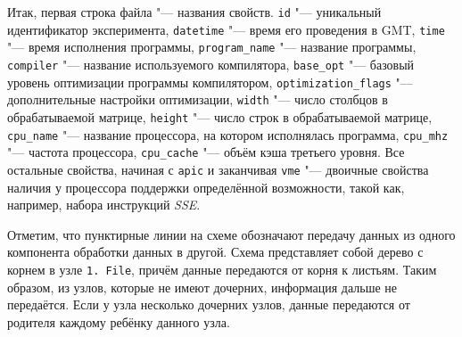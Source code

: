 \clearpage

Итак, первая строка файла "--- названия свойств. \texttt{id} "--- уникальный идентификатор эксперимента, \texttt{datetime} "--- время его проведения в GMT, \texttt{time} "--- время исполнения программы, \texttt{program_name} "--- название программы, \texttt{compiler} "--- название используемого компилятора, \texttt{base_opt} "--- базовый уровень оптимизации программы компилятором, \texttt{optimization_flags} "--- дополнительные настройки оптимизации, \texttt{width} "--- число столбцов в обрабатываемой матрице, \texttt{height} "--- число строк в обрабатываемой матрице, \texttt{cpu_name} "--- название процессора, на котором исполнялась программа, \texttt{cpu_mhz} "--- частота процессора, \texttt{cpu_cache} "--- объём кэша третьего уровня. Все остальные свойства, начиная с \texttt{apic} и заканчивая \texttt{vme} "--- двоичные свойства наличия у процессора поддержки определённой возможности, такой как, например, набора инструкций \textit{SSE}.

Отметим, что пунктирные линии на схеме обозначают передачу данных из одного компонента обработки данных в другой. Схема представляет собой дерево с корнем в узле \texttt{1.\,File}, причём данные передаются от корня к листьям. Таким образом, из узлов, которые не имеют дочерних, информация дальше не передаётся. Если у узла несколько дочерних узлов, данные передаются от родителя каждому ребёнку данного узла.


